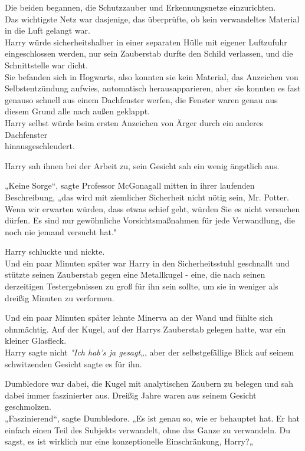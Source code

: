 {Die beiden begannen, die Schutzzauber und Erkennungsnetze einzurichten.\\ Das wichtigste Netz war dasjenige, das überprüfte, ob kein verwandeltes Material in die Luft gelangt war.\\ Harry würde sicherheitshalber in einer separaten Hülle mit eigener Luftzufuhr eingeschlossen werden, nur sein Zauberstab durfte den Schild verlassen, und die Schnittstelle war dicht.\\ Sie befanden sich in Hogwarts, also konnten sie kein Material, das Anzeichen von Selbstentzündung aufwies, automatisch herausapparieren, aber sie konnten es fast genauso schnell aus einem Dachfenster werfen, die Fenster waren genau aus diesem Grund alle nach außen geklappt.\\ Harry selbst würde beim ersten Anzeichen von Ärger durch ein anderes Dachfenster\\ hinausgeschleudert.

Harry sah ihnen bei der Arbeit zu, sein Gesicht sah ein wenig ängstlich aus.

„Keine Sorge“, sagte Professor McGonagall mitten in ihrer laufenden Beschreibung, „das wird mit ziemlicher Sicherheit nicht nötig sein, Mr. Potter. Wenn wir erwarten würden, dass etwas schief geht, würden Sie es nicht versuchen dürfen. Es sind nur gewöhnliche Vorsichtsmaßnahmen für jede Verwandlung, die noch nie jemand versucht hat."

Harry schluckte und nickte.\\ Und ein paar Minuten später war Harry in den Sicherheitsstuhl geschnallt und stützte seinen Zauberstab gegen eine Metallkugel - eine, die nach seinen derzeitigen Testergebnissen zu groß für ihn sein sollte, um sie in weniger als dreißig Minuten zu verformen.

Und ein paar Minuten später lehnte Minerva an der Wand und fühlte sich ohnmächtig. Auf der Kugel, auf der Harrys Zauberstab gelegen hatte, war ein kleiner Glasfleck.\\ Harry sagte nicht \emph{"Ich hab's ja gesagt„}, aber der selbstgefällige Blick auf seinem schwitzenden Gesicht sagte es für ihn.

Dumbledore war dabei, die Kugel mit analytischen Zaubern zu belegen und sah dabei immer faszinierter aus. Dreißig Jahre waren aus seinem Gesicht geschmolzen.\\ „Faszinierend“, sagte Dumbledore. „Es ist genau so, wie er behauptet hat. Er hat einfach einen Teil des Subjekts verwandelt, ohne das Ganze zu verwandeln. Du sagst, es ist wirklich nur eine konzeptionelle Einschränkung, Harry?„

}
